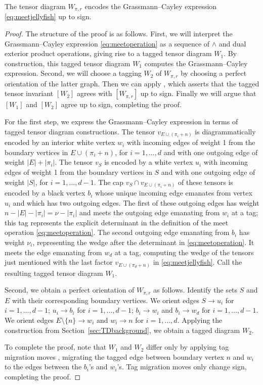 \begin{proposition}\label{prop:webs_are_tensors}
The tensor diagram $W_{\pi,r}$ encodes the Grassmann--Cayley expression \eqref{eq:meetjellyfish} up to sign.
\end{proposition}

\begin{proof}
The structure of the proof is as follows. First, we will interpret the Grassmann--Cayley expression \eqref{eq:meetoperation} as a sequence of $\wedge$ and dual exterior product operations, giving rise to a tagged tensor diagram $W_1$. By construction, this tagged tensor diagram $W_1$ computes the Grassmann--Cayley expression. Second, we will choose a tagging $W_2$ of $W_{\pi,r}$ by choosing a perfect orientation of the latter graph. Then we can apply \cite[Lemma 5.4]{Fraser.Lam.Le}, which asserts that the tagged tensor invariant $[W_2]$ agrees with $[W_{\pi,r}]$ up to sign.  Finally we will argue that $[W_1]$ and $[W_2]$ agree up to sign, completing the proof. 

For the first step, we express the Grassmann--Cayley expression in terms of tagged tensor diagram constructions. The tensor $v_{E\cup (\pi_i+n)}$ is diagrammatically encoded by an interior white vertex $w_i$ with incoming edges of weight 1 from the boundary vertices in $E \cup (\pi_i+n)$, for $i=1,\dots,d$ and with one outgoing edge of weight $|E|+|\pi_i|$. The tensor $v_S$ is encoded by a white vertex $u_i$ with incoming edges of weight 1 from the boundary vertices in $S$ and with one outgoing edge of weight $|S|$, for $i=1,\dots,d-1$. The cap $v_S \cap v_{E\cup (\pi_i+n)}$ of these tensors is encoded by a black vertex $b_i$ whose unique incoming edge emanates from vertex $u_i$ and which has two outgoing edges. The first of these outgoing edges has weight $n-|E| - |\pi_i| = \nu-|\pi_i|$ and meets the outgoing edge emanating from $w_i$ at a tag; this tag represents the explicit determinant in the definition of the meet operation \eqref{eq:meetoperation}. The second outgoing edge emanating from $b_i$ has weight $\nu_i$, representing the wedge after the determinant in  \eqref{eq:meetoperation}. It meets the edge emanating from $w_d$ at a tag, computing the wedge of the tensors just mentioned with the last factor $v_{E \cup (\pi_d+n)}$ in \eqref{eq:meetjellyfish}. Call the resulting tagged tensor diagram $W_1$. 

Second, we obtain a perfect orientation of $W_{\pi,r}$ as follows. Identify the sets $S$ and $E$ with their corresponding boundary vertices. We orient edges $S \to u_i$ for $i=1,\dots,d-1$; $u_i \to b_i$ for $i=1,\dots,d-1$; $b_i \to w_i$ and $b_i \to w_d$ for $i=1,\dots,d-1$. We orient edges $E \setminus \{n\} \to w_i$ and $w_i \to n$ for $i=1,\dots,d$. Applying the construction from Section~\ref{sec:TDbackground}, we obtain a tagged diagram $W_2$. 

To complete the proof, note that $W_1$ and $W_2$ differ only by applying tag migration moves \cite[Equation 2.7]{Cautis.Kamnitzer.Morrison}, migrating the tagged edge between boundary vertex $n$ and $w_i$ to the edges between the $b_i$'s and $w_i$'s. Tag migration moves only change sign, completing the proof.
\end{proof}

